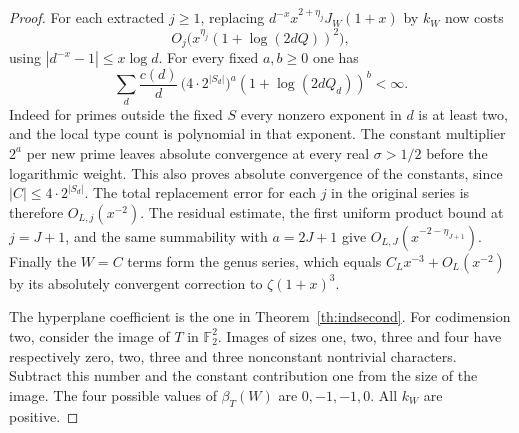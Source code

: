 \begin{proof}
For each extracted $j\ge1$, replacing $d^{-x}x^{2+\eta_j}J_W(1+x)$ by $k_W$ now costs
\[
 O_j\bigl(x^{\eta_j}(1+\log (2dQ))^2\bigr),
\]
using $|d^{-x}-1|\le x\log d$. For every fixed $a,b\ge0$ one has
\[
 \sum_d \frac{c(d)}d\,
    \bigl(4\cdot2^{|S_d|}\bigr)^a(1+\log(2dQ_d))^b<\infty.
\]
Indeed for primes outside the fixed $S$ every nonzero exponent in $d$ is at least two, and the local type count is polynomial in that exponent. The constant multiplier $2^a$ per new prime leaves absolute convergence at every real $\sigma>1/2$ before the logarithmic weight. This also proves absolute convergence of the constants, since $|C|\le 4\cdot 2^{|S_d|}$. The total replacement error for each $j$ in the original series is therefore $O_{L,j}(x^{-2})$. The residual estimate, the first uniform product bound at $j=J+1$, and the same summability with $a=2J+1$ give $O_{L,J}(x^{-2-\eta_{J+1}})$. Finally the $W=C$ terms form the genus series, which equals $C_L x^{-3}+O_L(x^{-2})$ by its absolutely convergent correction to $\zeta(1+x)^3$.

The hyperplane coefficient is the one in Theorem~\ref{th:indsecond}. For codimension two, consider the image of $T$ in $\mathbb F_2^2$. Images of sizes one, two, three and four have respectively zero, two, three and three nonconstant nontrivial characters. Subtract this number and the constant contribution one from the size of the image. The four possible values of $\beta_T(W)$ are $0,-1,-1,0$. All $k_W$ are positive.
\end{proof}

